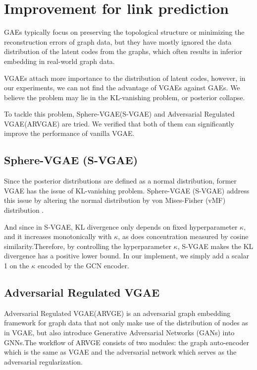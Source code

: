 \documentclass[fleqn,10pt]{SelfArx} %
\begin{document}
\section{Improvement for link prediction}
GAEs typically focus on preserving the topological structure or minimizing the reconstruction errors of graph data, but they have mostly ignored the data distribution of the latent codes from the graphs, which often results in inferior embedding in real-world graph data.

VGAEs attach more importance to the distribution of latent codes, however, in our experiments, we can not find the advantage of VGAEs against GAEs. We believe the problem may lie in the KL-vanishing problem, or posterior collapse\cite{bowman2015generating}.

To tackle this problem, Sphere-VGAE(S-VGAE) \cite{davidson2018hyperspherical,xu2018spherical} and 
Adversarial Regulated VGAE(ARVGAE)\cite{pan2018adversarially} are tried. We verified that both of them can significantly improve the performance of vanilla VGAE.

\subsection{Sphere-VGAE (S-VGAE)}
Since the posterior distributions are defined as a normal distribution, former VGAE has the issue of 
KL-vanishing problem. Sphere-VGAE (S-VGAE) \cite{davidson2018hyperspherical,xu2018spherical} address this issue by altering the normal distribution by von Mises-Fisher (vMF) distribution .

And since in S-VGAE, KL divergence only depends on fixed hyperparameter $\kappa$, and it increases monotonically with $\kappa$, as does concentration measured by cosine similarity.Therefore, by controlling the hyperparameter $\kappa$, S-VGAE makes the KL divergence has a positive lower bound. In our implement, we simply add a scalar 1 on the $\kappa$ encoded by the GCN encoder.

\subsection{Adversarial Regulated VGAE}
Adversarial Regulated VGAE(ARVGE)\cite{pan2018adversarially} is an adversarial graph embedding framework for graph data that not only make use of the distribution of nodes as in VGAE, but also introduce Generative Adversarial Networks (GANs) into GNNs.The workflow of ARVGE consists of two modules: the graph auto-encoder which is the same as VGAE and the adversarial network which serves as the adversarial regularization.
\end{document}
